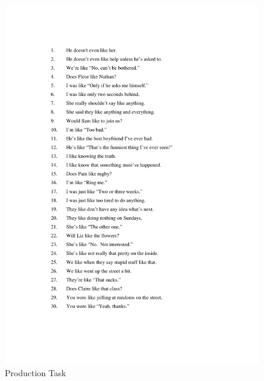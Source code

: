 \begin{figure}[htbp]
	\centering
		\includegraphics[width=5in]{images/ExpProductionTask.pdf}
	\caption{Production Task}
	\label{fig:ExpProductionTask}
\end{figure}




